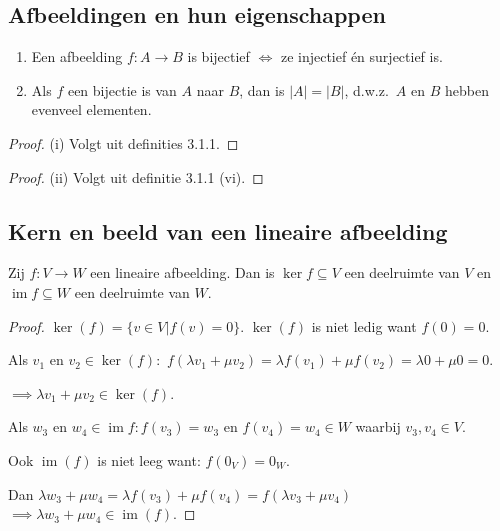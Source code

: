 \subsection{Afbeeldingen en hun eigenschappen}

\begin{lemma}[3.1.3]
    \begin{enumerate}
        \item[(i)] Een afbeelding $f \colon A \to B$ is bijectief \(\iff\) ze injectief én surjectief is.
        \item[(ii)] Als $f$ een bijectie is van $A$ naar $B$, dan is $|A| = |B|$, d.w.z.\ $A$ en $B$ hebben evenveel elementen.
    \end{enumerate}
\end{lemma}
\begin{proof}(i)
    Volgt uit definities 3.1.1.
\end{proof}
\begin{proof}(ii)
    Volgt uit definitie 3.1.1 (vi).
\end{proof}
\subsection{Kern en beeld van een lineaire afbeelding}

\begin{lemma}[3.2.2]
    Zij $f \colon V \to W$ een lineaire afbeelding. Dan is $\ker f \subseteq V$ een deelruimte van $V$ en $\operatorname{im} f \subseteq W$ een deelruimte van $W$.
\end{lemma}
\begin{proof}
    \(\ker (f) = \{ v \in V |f(v) = 0\}. \)
    \(\ker (f)\) is niet ledig want \(f(0) = 0\).
    
    Als \(v_1\) en \(v_2 \in \ker (f):\)
    \(f(\lambda v_1 + \mu v_2) = \lambda f( v_1) + \mu f( v_2)
    = \lambda 0 + \mu 0
    = 0\).

    \(\implies \lambda v_1 + \mu v_2 \in \ker (f)\).

    Als \(w_3\) en \(w_4 \in \operatorname{im} f: f(v_3) = w_3\) en \(f(v_4) = w_4 \in W\) 
    waarbij \(v_3,v_4 \in V\).

    Ook \(\operatorname{im}(f)\) is niet leeg want: \(f(0_V) = 0_W\).

    Dan 
    \(\lambda w_3 + \mu w_4 
    = \lambda f( v_3) + \mu f( v_4)
    =f(\lambda v_3 + \mu v_4) \)
    \(\implies \lambda w_3 + \mu w_4  \in \operatorname{im}(f) \).
\end{proof}

